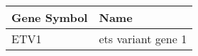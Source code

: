 \begin{tabular}{ll}
\toprule
Gene Symbol &               Name \\
\midrule
       ETV1 & ets variant gene 1 \\
\bottomrule
\end{tabular}
